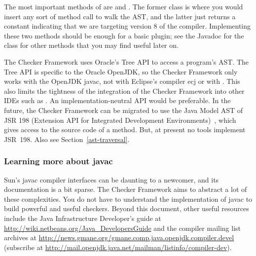 The most important methods of 
are  and . The former
class is where you would insert any sort of method call to walk the AST\@,
and the latter just returns a constant indicating that we are targeting
version 8 of the compiler. Implementing these two methods should be enough
for a basic plugin; see the Javadoc for the class for other methods that
you may find useful later on.

The Checker Framework uses Oracle's Tree API to access a program's AST\@.
The Tree API is specific to the Oracle OpenJDK, so the Checker Framework only
works with the OpenJDK javac, not with Eclipse's compiler ecj or with
.  This also limits the tightness of
the integration of the Checker Framework into other IDEs such as \@.
An implementation-neutral API would be preferable.
In the future, the Checker Framework
can be migrated to use the Java Model AST of JSR 198 (Extension API for
Integrated Development Environments)~\cite{JSR198}, which gives access to
the source code of a method.  But, at present no tools
implement JSR~198.  Also see Section~\ref{ast-traversal}.



\subsubsection{Learning more about javac}

Sun's javac compiler interfaces can be daunting to a
newcomer, and its documentation is a bit sparse. The Checker Framework
aims to abstract a lot of these complexities.
You do not have to understand the implementation of javac to
build powerful and useful checkers.
Beyond this document, 
other useful resources include the Java Infrastructure
Developer's guide at
\url{http://wiki.netbeans.org/Java_DevelopersGuide} and the compiler
mailing list archives at
\url{http://news.gmane.org/gmane.comp.java.openjdk.compiler.devel}
(subscribe at
\url{http://mail.openjdk.java.net/mailman/listinfo/compiler-dev}).



